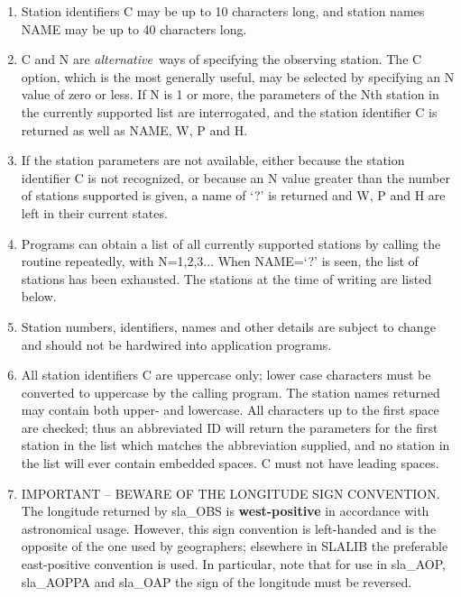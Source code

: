 {
 \begin{enumerate}
  \item Station identifiers C may be up to 10 characters long,
        and station names NAME may be up to 40 characters long.
  \item C and N are {\it alternative}\, ways of specifying the observing
        station.  The C option, which is the most generally useful,
        may be selected by specifying an N value of zero or less.
        If N is 1 or more, the parameters of the Nth station
        in the currently supported list are interrogated, and
        the station identifier C is returned as well as NAME, W,
        P and H.
  \item If the station parameters are not available, either because
        the station identifier C is not recognized, or because an
        N value greater than the number of stations supported is
        given, a name of `?' is returned and W, P and H are left in
        their current states.
  \item Programs can obtain a list of all currently supported
        stations by calling the routine repeatedly, with N=1,2,3...
        When NAME=`?' is seen, the list of stations has been
        exhausted.  The stations at the time of writing are listed
        below.
  \item Station numbers, identifiers, names and other details are
        subject to change and should not be hardwired into
        application programs.
  \item All station identifiers C are uppercase only;  lower case
        characters must be converted to uppercase by the calling
        program.  The station names returned may contain both upper-
        and lowercase.  All characters up to the first space are
        checked;  thus an abbreviated ID will return the parameters
        for the first station in the list which matches the
        abbreviation supplied, and no station in the list will ever
        contain embedded spaces.  C must not have leading spaces.
  \item IMPORTANT -- BEWARE OF THE LONGITUDE SIGN CONVENTION.  The
        longitude returned by sla\_OBS is
        {\bf west-positive} in accordance with astronomical
        usage.  However, this sign convention is left-handed and is
        the opposite of the one used by geographers; elsewhere in
        SLALIB the preferable east-positive convention is used.  In
        particular, note that for use in sla\_AOP, sla\_AOPPA and
        sla\_OAP the sign of the longitude must be reversed.

\end{enumerate}}
